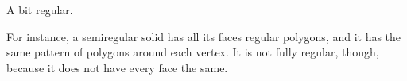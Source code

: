 A bit regular.
\par
For instance, a semiregular solid has all its faces regular
polygons, and it has the same pattern of polygons around each vertex. It
is not fully regular, though, because it does not have every face the same.